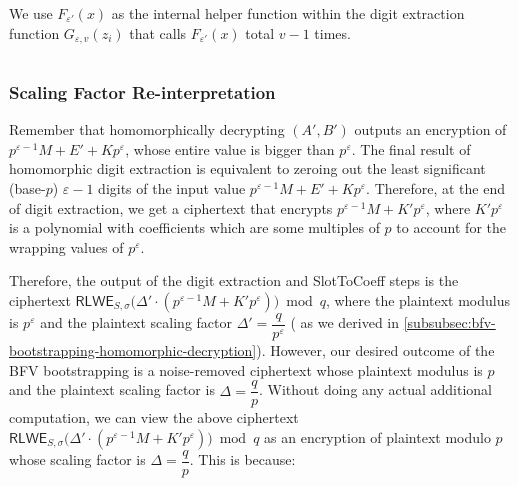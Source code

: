 We use $F_{\varepsilon'}(x)$ as the internal helper function within the digit extraction function $G_{\varepsilon,v}(z_i)$ that calls $F_{\varepsilon'}(x)$ total $v-1$ times.


$ $



\subsubsection{Scaling Factor Re-interpretation} 
\label{subsubsec:bfv-bootstrapping-scaling-factor-reinterpretation}

Remember that homomorphically decrypting $(A', B')$ outputs an encryption of $p^{\varepsilon-1}M + E' + Kp^\varepsilon$, whose entire value is bigger than $p^\varepsilon$. The final result of homomorphic digit extraction is equivalent to zeroing out the least significant (base-$p$) $\varepsilon-1$ digits of the input value $p^{\varepsilon-1}M + E' + Kp^\varepsilon$. Therefore, at the end of digit extraction, we get a ciphertext that encrypts $p^{\varepsilon-1}M + K'p^\varepsilon$, where $K'p^\varepsilon$ is a polynomial with coefficients which are some multiples of $p$ to account for the wrapping values of $p^\varepsilon$. 

Therefore, the output of the digit extraction and \textsf{SlotToCoeff} steps is the ciphertext $\textsf{RLWE}_{S, \sigma}\bm(\Delta' \cdot (p^{\varepsilon-1}M + K'p^\varepsilon)\bm) \bmod q$, where the plaintext modulus is $p^\varepsilon$ and the plaintext scaling factor $\Delta' = \dfrac{q}{p^\varepsilon}$ (
as we derived in \autoref{subsubsec:bfv-bootstrapping-homomorphic-decryption}). However, our desired outcome of the BFV bootstrapping is a noise-removed ciphertext whose plaintext modulus is $p$ and the plaintext scaling factor is $\Delta=\dfrac{q}{p}$. Without doing any actual additional computation, we can view the above ciphertext $\textsf{RLWE}_{S, \sigma}\bm(\Delta' \cdot (p^{\varepsilon-1}M + K'p^\varepsilon)\bm) \bmod q$ as an encryption of plaintext modulo $p$ whose scaling factor is $\Delta = \dfrac{q}{p}$. This is because:


